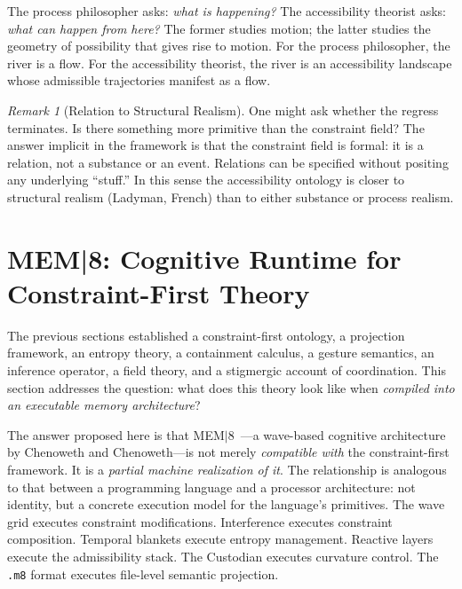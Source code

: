 \documentclass[12pt, a4paper, twoside]{article}
\theoremstyle{plain}
\theoremstyle{definition}
\theoremstyle{remark}
\newtheorem{remark}[theorem]{Remark}
\begin{document}
\bigskip

The process philosopher asks: \emph{what is happening?} The accessibility
theorist asks: \emph{what can happen from here?} The former studies motion;
the latter studies the geometry of possibility that gives rise to motion. For
the process philosopher, the river is a flow. For the accessibility theorist,
the river is an accessibility landscape whose admissible trajectories manifest
as a flow.

\begin{remark}[Relation to Structural Realism]
One might ask whether the regress terminates. Is there something more primitive
than the constraint field? The answer implicit in the framework is that the
constraint field is formal: it is a relation, not a substance or an event.
Relations can be specified without positing any underlying ``stuff.'' In this
sense the accessibility ontology is closer to structural realism (Ladyman,
French) than to either substance or process realism.
\end{remark}


\section{MEM|8: Cognitive Runtime for Constraint-First Theory}
\label{sec:mem8}

The previous sections established a constraint-first ontology, a projection
framework, an entropy theory, a containment calculus, a gesture semantics, an
inference operator, a field theory, and a stigmergic account of coordination.
This section addresses the question: what does this theory look like when
\emph{compiled into an executable memory architecture}?

The answer proposed here is that MEM$|$8~\cite{mem8_2025}---a wave-based
cognitive architecture by Chenoweth and Chenoweth---is not merely
\emph{compatible with} the constraint-first framework. It is a \emph{partial
machine realization of it}. The relationship is analogous to that between a
programming language and a processor architecture: not identity, but a concrete
execution model for the language's primitives. The wave grid executes constraint
modifications. Interference executes constraint composition. Temporal blankets
execute entropy management. Reactive layers execute the admissibility stack.
The Custodian executes curvature control. The \texttt{.m8} format executes
file-level semantic projection.
\end{document}

